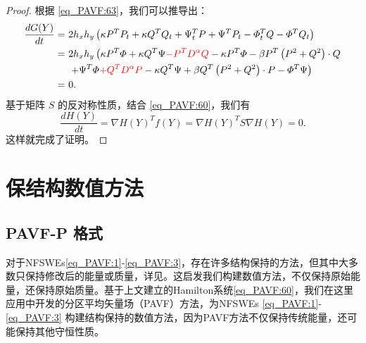 \begin{proof}
	根据 \eqref{eq_PAVF:63}，我们可以推导出：
	\begin{align}\label{eq_PAVF:64}
		\frac{d G(Y)}{d t}=&~2 h_{x} h_{y}\left(\kappa P^{T}P_t+\kappa Q^{T}Q_t+\Psi^{T}_t P+\Psi^{T}P_{t}-\varPhi^{T}_t Q-\varPhi^{T}Q_{t}\right)\nonumber\\
		=&~2 h_{x} h_{y}\left(\kappa P^{T}\varPhi+\kappa Q^{T}\Psi \textcolor[rgb]{1.00,0.00,0.00}{- P^{T}D^{\alpha}Q}-\kappa P^{T}\varPhi-\beta P^{T}\left( P^{2}+Q^{2}\right)\cdot Q\right.\nonumber\\
		&~\left.+\Psi^{T}\varPhi\textcolor[rgb]{1.00,0.00,0.00}{+Q^{T}D^{\alpha}P}-\kappa Q^{T}\Psi+\beta Q^{T}\left( P^{2}+Q^{2}\right)\cdot P-\varPhi^{T}\Psi\right)\nonumber\\
		=&~0.
		\end{align}
		基于矩阵 $S$ 的反对称性质，结合 \eqref{eq_PAVF:60}，我们有
		\begin{equation}\label{eq_PAVF:65}
		\frac{d H(Y)}{d t}=\nabla H(Y)^{T} f(Y)=\nabla H(Y)^{T} S \nabla H(Y)=0 .
		\end{equation}
		这样就完成了证明。
		\end{proof}


	\section{保结构数值方法}\label{Section_PAVF: 3}
	\subsection{PAVF-P 格式}

对于NFSWEs\eqref{eq_PAVF:1}-\eqref{eq_PAVF:3}，存在许多结构保持的方法，但其中大多数只保持修改后的能量或质量，详见\cite{liFastEnergyConserving2018,huEfficientEnergyPreserving2022}。这启发我们构建数值方法，不仅保持原始能量，还保持原始质量。基于上文建立的Hamilton系统\eqref{eq_PAVF:60}，我们在这里应用\cite{caiPartitionedAveragedVector2018}中开发的分区平均矢量场（PAVF）方法，为NFSWEs \eqref{eq_PAVF:1}-\eqref{eq_PAVF:3} 构建结构保持的数值方法，因为PAVF方法不仅保持传统能量，还可能保持其他守恒性质。

